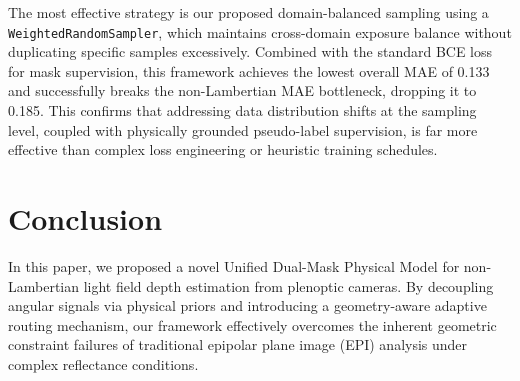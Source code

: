 \documentclass[lettersize,journal]{IEEEtran}
\begin{document}
The most effective strategy is our proposed domain-balanced sampling using a \texttt{WeightedRandomSampler}, which maintains cross-domain exposure balance without duplicating specific samples excessively. Combined with the standard BCE loss for mask supervision, this framework achieves the lowest overall MAE of 0.133 and successfully breaks the non-Lambertian MAE bottleneck, dropping it to 0.185. This confirms that addressing data distribution shifts at the sampling level, coupled with physically grounded pseudo-label supervision, is far more effective than complex loss engineering or heuristic training schedules.


\section{Conclusion}

In this paper, we proposed a novel Unified Dual-Mask Physical Model for non-Lambertian light field depth estimation from plenoptic cameras. By decoupling angular signals via physical priors and introducing a geometry-aware adaptive routing mechanism, our framework effectively overcomes the inherent geometric constraint failures of traditional epipolar plane image (EPI) analysis under complex reflectance conditions. 
\end{document}
